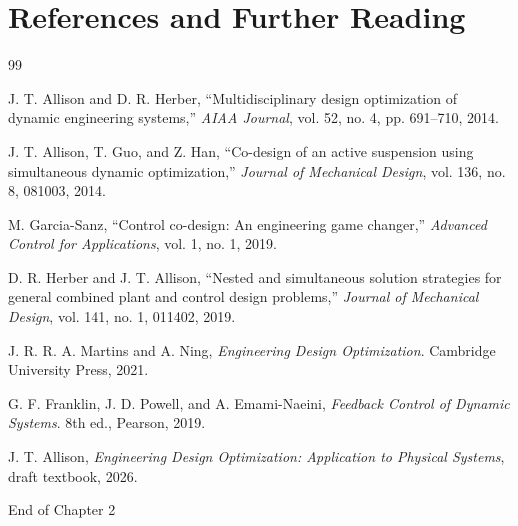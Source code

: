 \documentclass[11pt]{article}
\begin{document}
\section{References and Further Reading}

\begin{thebibliography}{99}

J. T. Allison and D. R. Herber, ``Multidisciplinary design optimization of dynamic engineering systems,'' \emph{AIAA Journal}, vol. 52, no. 4, pp. 691--710, 2014.

J. T. Allison, T. Guo, and Z. Han, ``Co-design of an active suspension using simultaneous dynamic optimization,'' \emph{Journal of Mechanical Design}, vol. 136, no. 8, 081003, 2014.

M. Garcia-Sanz, ``Control co-design: An engineering game changer,'' \emph{Advanced Control for Applications}, vol. 1, no. 1, 2019.

D. R. Herber and J. T. Allison, ``Nested and simultaneous solution strategies for general combined plant and control design problems,'' \emph{Journal of Mechanical Design}, vol. 141, no. 1, 011402, 2019.

J. R. R. A. Martins and A. Ning, \emph{Engineering Design Optimization}. Cambridge University Press, 2021.

G. F. Franklin, J. D. Powell, and A. Emami-Naeini, \emph{Feedback Control of Dynamic Systems}. 8th ed., Pearson, 2019.

J. T. Allison, \emph{Engineering Design Optimization: Application to Physical Systems}, draft textbook, 2026.

\end{thebibliography}

\vfill
\begin{center}
\small\color{CCDgray}
End of Chapter 2
\end{center}
\end{document}
